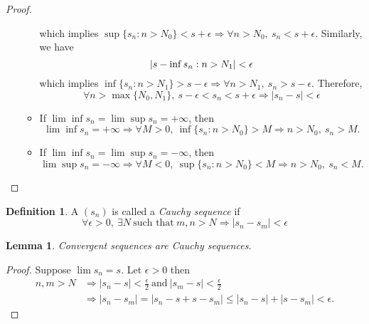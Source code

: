\documentclass[12pt, lettersize]{book}
\theoremstyle{plain}
\newtheorem{lem}[thm]{Lemma}
\theoremstyle{definition}
\newtheorem{dfn}[thm]{Definition}
\theoremstyle{remark}
\begin{document}
\begin{proof}
\begin{enumerate}[(i)]
\begin{itemize}
				  	  which implies $\sup\{s_n: n>N_0\}<s+\epsilon\Rightarrow\forall n>N_0,\ s_n<s+\epsilon$.
				  	  Similarly, we have 
				  	  \begin{displaymath}
				  	  	\abs{s-\inf{s_n:n>N_1}}<\epsilon
				  	  \end{displaymath}
			  	  	  which implies $\inf\{s_n: n>N_1\}>s-\epsilon\Rightarrow\forall n>N_1,\ s_n>s-\epsilon$.
			  	  	  Therefore,
			  	  	  \begin{displaymath}
			  	  	  	\forall n>\max\{N_0,N_1\},\ s-\epsilon<s_n<s+\epsilon\Rightarrow |s_n-s|<\epsilon	
			  	  	  \end{displaymath}
		  	  	  	  \item If $\lim\inf s_n=\lim\sup s_n=+\infty$, then
		  	  	  	  \begin{displaymath}
		  	  	  	  	\lim\inf s_n=+\infty\Rightarrow \forall M>0,\ \inf\{s_n:n>N_0\}>M\Rightarrow n>N_0,\ s_n>M.
		  	  	  	  \end{displaymath}
	  	  	  	  	  \item If $\lim\inf s_n=\lim\sup s_n=-\infty$, then
	  	  	  	  	  \begin{displaymath}
	  	  	  	  	  	\lim\sup s_n=-\infty\Rightarrow \forall M<0,\ \sup\{s_n:n>N_0\}<M\Rightarrow n>N_0,\ s_n<M.
	  	  	  	  	  \end{displaymath}
				  \end{itemize}
		\end{enumerate}
		\end{proof}
		
		\begin{dfn}\label{def:cauchy-seq}
		A $(s_n)$ is called a \emph{Cauchy sequence} if 
		\begin{displaymath}
			\forall\epsilon>0,\ \exists N\ \text{such that}\ m,n>N\Rightarrow|s_n-s_m|<\epsilon
		\end{displaymath}
		\end{dfn}
		\begin{lem}
		Convergent sequences are Cauchy sequences.
		\end{lem}
		\begin{proof}
		Suppose $\lim s_n=s$. Let $\epsilon>0$ then
		\begin{align*}
			n,m>N &\Rightarrow |s_n-s|<\frac{\epsilon}{2}\ \text{and}\ |s_m-s|<\frac{\epsilon}{2}\\
				  &\Rightarrow |s_n-s_m|=|s_n-s+s-s_m|\leq|s_n-s|+|s-s_m|<\epsilon.
		\end{align*}
		\end{proof}
		
\end{document}
